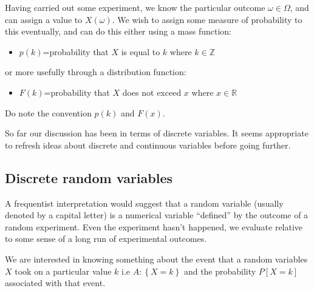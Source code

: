 \documentclass[12pt]{extbook}
\begin{document}
Having carried out some experiment, we know the particular outcome $\omega \in \Omega$, and can assign a value to $X(\omega)$.   We wish to assign some measure of probability to this eventually, and can do this either using a mass function:

\begin{itemize}
\item $p(k)$=probability that $X$ is equal to $k$ where $k \in \mathbb{Z}$
\end{itemize}

or more usefully through a distribution function:

\begin{itemize}
\item $F(k)$=probability that $X$ does not exceed $x$ where $x \in \mathbb{R}$
\end{itemize}

Do note the convention $p(k)$ and $F(x)$.



So far our discussion has been in terms of discrete variables.   It seems appropriate to refresh ideas about discrete and continuous variables before going further.




\subsection{Discrete random variables}


A frequentist interpretation would suggest that a random variable (usually denoted by a capital letter) is a numerical variable ``defined'' by the outcome of a random experiment.   Even the experiment hasn't happened, we evaluate relative to some sense of a long run of experimental outcomes.   


We are interested in knowing something about the event that a random variables $X$ took on a particular value $k$ i.e  $A: \left\{ X=k \right\}$ and the probability $P[X=k]$ associated with that event.
\end{document}
